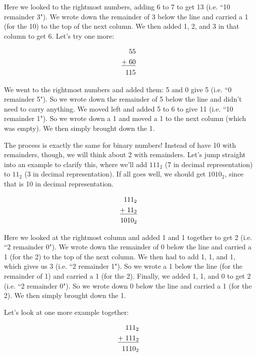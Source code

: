 Here we looked to the rightmost numbers, adding 6 to 7 to get 13 (i.e. ``10 remainder 3"). We wrote down the remainder of 3 below the line and carried a 1 (for the 10) to the top of the next column. We then added 1, 2, and 3 in that column to get 6. Let's try one more:

\begin{align*}
55&\\
\underline{+\hspace{1mm}60}&\\
115&\\
\end{align*}

We went to the rightmost numbers and added them: 5 and 0 give 5 (i.e. ``0 remainder 5"). So we wrote down the remainder of 5 below the line and didn't need to carry anything. We moved left and added 5 to 6 to give 11 (i.e. ``10 remainder 1"). So we wrote down a 1 and moved a 1 to the next column (which was empty). We then simply brought down the 1. 

The process is exactly the same for binary numbers! Instead of have 10 with remainders, though, we will think about 2 with remainders. Let's jump straight into an example to clarify this, where we'll add $111_{2}$ (7 in decimal representation) to $11_{2}$ (3 in decimal representation). If all goes well, we should get $1010_{2}$, since that is 10 in decimal representation. 

\begin{align*}
111_{2}&\\
\underline{+\hspace{1mm}11_{2}}&\\
1010_2&\\
\end{align*}

Here we looked at the rightmost column and added 1 and 1 together to get 2 (i.e. ``2 remainder 0"). We wrote down the remainder of 0 below the line and carried a 1 (for the 2) to the top of the next column. We then had to add 1, 1, and 1, which gives us 3 (i.e. ``2 remainder 1"). So we wrote a 1 below the line (for the remainder of 1) and carried a 1 (for the 2). Finally, we added 1, 1, and 0 to get 2 (i.e. ``2 remainder 0"). So we wrote down 0 below the line and carried a 1 (for the 2). We then simply brought down the 1. 

Let's look at one more example together: 

\begin{align*}
111_{2}&\\
\underline{+\hspace{1mm}111_{2}}&\\
1110_2&\\
\end{align*}

